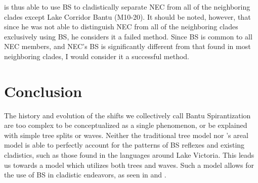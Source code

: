 \documentclass[output=paper,colorlinks,citecolor=brown
]{langscibook}
\begin{document}
\citeauthor{hinnebusch1981} is thus able to use BS to cladistically separate NEC from all of the neighboring clades except Lake Corridor Bantu (M10-20). It should be noted, however, that since he was not able to distinguish NEC from all of the neighboring clades exclusively using BS, he considers it a failed method. Since BS is common to all NEC members, and NEC’s BS is significantly different from that found in most neighboring clades, I would consider it a successful method. 

\section{Conclusion}

The history and evolution of the shifts we collectively call Bantu Spirantization are too complex to be conceptualized as a single phenomenon, or be explained with simple tree splits or waves. Neither the traditional tree model nor \citeauthor{Janson2007}’s areal model is able to perfectly account for the patterns of BS reflexes and existing cladistics, such as those found in the languages around Lake Victoria. This leads us towards a model which utilizes both trees and waves. Such a model allows for the use of BS in cladistic endeavors, as seen in \citet{hinnebusch1981} and \citet{bostoen2019}.





\end{document}
